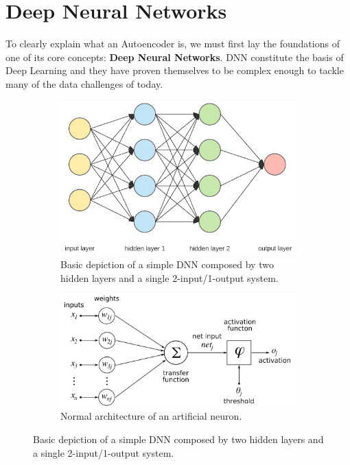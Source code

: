 \label{chap:BasicPrin}
\section{Deep Neural Networks}

To clearly explain what an Autoencoder is, we must first lay the foundations of one of its core concepts: \textbf{Deep Neural Networks}. DNN constitute the basis of Deep Learning and they have proven themselves to be complex enough to tackle many of the data challenges of today. \par

\begin{figure}[H]
	\begin{subfigure}{0.65\linewidth}  
		\centering
		\includegraphics[width=\linewidth]{Figuras_tfg/Figure2_tfg}
		\caption{Basic depiction of a simple DNN composed by two hidden layers and a single 2-input/1-output system.}
		\label{fig:fig2a} 
	\end{subfigure}
	
	\begin{subfigure}{0.65\linewidth} 
		\centering
		\includegraphics[width=\linewidth]{Figuras_tfg/ArtificialNeuronModel_english.png}
		\caption{Normal architecture of an artificial neuron.}
		\label{fig:fig2b} 
	\end{subfigure}
	\caption{Basic depiction of a simple DNN composed by two hidden layers and a single 2-input/1-output system.}
	\label{fig:fig2}
\end{figure}

